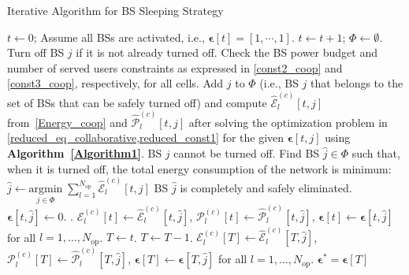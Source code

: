 \documentclass[10pt, letter, twocolumn]{IEEEtran}
\begin{document}
\begin{algorithm}[t!]
\small
\caption{Iterative Algorithm for BS Sleeping Strategy}
\label{Algorithm2}
\begin{algorithmic}[1]
\STATE $t \gets 0$; Assume all BSs are activated, i.e., $\boldsymbol{\epsilon}[t]=\left[1,\cdots,1\right]$. \label{alg2:start}
\REPEAT
\STATE $t \gets t + 1$; $\Phi \gets \emptyset$.
\STATE Turn off BS $j$ if it is not already turned off.
\STATE Check the BS power budget and number of served users constraints as expressed in \eqref{const2_coop} and \eqref{const3_coop}, respectively, for all cells.
\STATE Add $j$ to $\Phi$ (i.e., BS $j$ that belongs to the set of BSs that can be safely turned off) and compute $\hat{\mathcal{E}}_{l}^{(c)}[t,j]$ from~\eqref{Energy_coop} and $\hat{\mathcal{P}}_{l}^{(c)}[t,j]$ after solving the optimization problem in \cref{reduced_eq_collaborative,reduced_const1} for the given $\boldsymbol{\epsilon}[t,j]$ using \textbf{Algorithm~\ref{Algorithm1}}.
\ELSE
\STATE BS $j$ cannot be turned off.
\ENDIF
\ENDFOR
\STATE Find BS $\hat{j}\in \Phi$ such that, when it is turned off, the total energy consumption of the network is minimum: $\hat{j} \gets \underset{j\in \Phi}{\text{argmin}}\; \sum_{l=1}^{N_{\text{op}}} \hat{\mathcal{E}}_{l}^{(c)}[t,j]$
\STATE BS $\hat{j}$ is completely and safely eliminated. $\boldsymbol{\epsilon}[t,\hat{j}] \gets 0$.
. \label{alg2:repeat_end}
\STATE $\mathcal{E}_{l}^{(c)}[t] \gets \hat{\mathcal{E}}_{l}^{(c)}[t,\hat{j}]$, $\mathcal{P}_{l}^{(c)}[t] \gets \hat{\mathcal{P}}_{l}^{(c)}[t,\hat{j}]$, $\boldsymbol{\epsilon}[t] \gets \boldsymbol{\epsilon}[t,\hat{j}]$ for all $l = 1,\ldots, N_{\text{op}}$.
\STATE $T \gets t$.
\STATE $T \gets T - 1$.
\STATE $\mathcal{E}_{l}^{(c)}[T] \gets \hat{\mathcal{E}}_{l}^{(c)}[T,\hat{j}]$, $\mathcal{P}_{l}^{(c)}[T] \gets \hat{\mathcal{P}}_{l}^{(c)}[T,\hat{j}]$, $\boldsymbol{\epsilon}[T] \gets \boldsymbol{\epsilon}[T,\hat{j}]$ for all $l = 1,\ldots, N_{\text{op}}$.
\ENDWHILE
\STATE $\boldsymbol{\epsilon}^{*} = \boldsymbol{\epsilon}[T]$
\end{algorithmic}
\end{algorithm}
\normalsize
\end{document}
